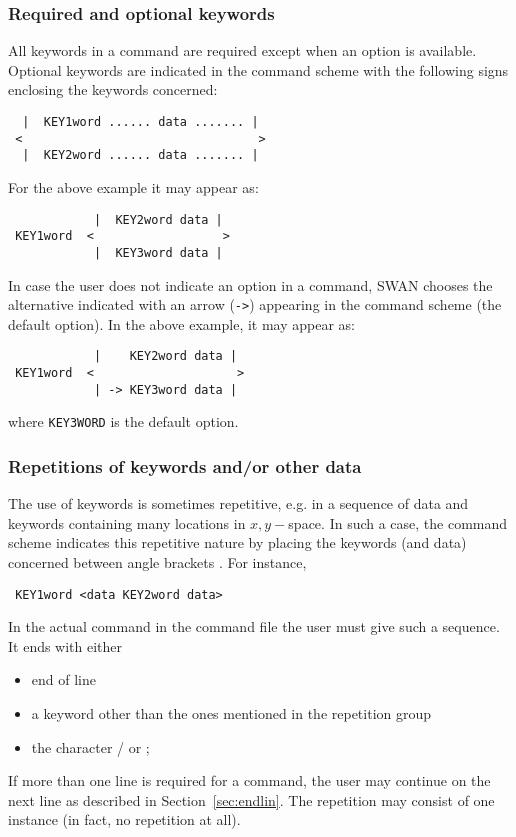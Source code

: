 \documentclass[12pt]{book}
\begin{document}
\subsubsection{Required and optional keywords}

All keywords in a command are required except when an option is available.
\\[2ex]
\noindent
Optional keywords are indicated in the command scheme with the following signs enclosing the keywords concerned:
\begin{verbatim}
  |  KEY1word ...... data ....... |
 <                                 >
  |  KEY2word ...... data ....... |
\end{verbatim}
For the above example it may appear as:
\begin{verbatim}
            |  KEY2word data |
 KEY1word  <                  >
            |  KEY3word data |
\end{verbatim}
In case the user does not indicate an option in a command, SWAN chooses the alternative indicated with an arrow ({\tt ->})
appearing in the command scheme (the default option). In the above example, it may appear as:
\begin{verbatim}
            |    KEY2word data |
 KEY1word  <                    >
            | -> KEY3word data |
\end{verbatim}
where {\tt KEY3WORD} is the default option.

\subsubsection{Repetitions of keywords and/or other data}

The use of keywords is sometimes repetitive, e.g. in a sequence of data and keywords containing many locations in $x,y-$space.
In such a case, the command scheme indicates this repetitive nature by placing the keywords (and data) concerned between
angle brackets {\tt < >}. For instance,
\begin{verbatim}
 KEY1word <data KEY2word data>
\end{verbatim}
In the actual command in the command file the user must give such a sequence. It ends with either
\begin{itemize}
  \item end of line
  \item a keyword other than the ones mentioned in the repetition group
  \item the character / or ;
\end{itemize}
If more than one line is required for a command, the user may continue on the next line as described in Section~\ref{sec:endlin}.
The repetition may consist of one instance (in fact, no repetition at all).
\end{document}
